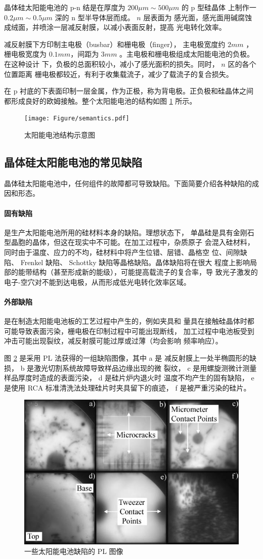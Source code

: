 晶体硅太阳能电池的 p-n 结是在厚度为 $200\mu m \sim 500\mu m$ 的 p 型硅晶体
上制作一 $0.2 \mu m \sim 0.5 \mu m$ 深的 n 型半导体层而成。 $n$ 层表面为
感光面，感光面用碱腐蚀成绒面，并喷涂一层减反射膜，以减小表面反射，提高
光电转化效率。

减反射膜下方印制主电极（busbar）和栅电极（finger），
主电极宽度约 $2mm$ ，栅电极宽度为
$0.1mm$，间距为 $3mm$ 。主电极和栅电极组成太阳能电池的负极。在这种设计
下，负极的总面积较小，减小了感光面积的损失。同时， $n$ 区的各个位置距离
栅电极都较近，有利于收集载流子，减少了载流子的复合损失。

在 p 衬底的下表面印制一层金属，作为正极，称为背电极。正负极和硅晶体之间
都形成良好的欧姆接触。整个太阳能电池的结构如图 \ref{fig:semantics} 所示。

\begin{figure}
\centering
\texttt{[image: Figure/semantics.pdf]}
\caption{太阳能电池结构示意图}
\label{fig:semantics}
\end{figure}

\subsection{晶体硅太阳能电池的常见缺陷}

晶体硅太阳能电池中，任何组件的故障都可导致缺陷。下面简要介绍各种缺陷的成
因和形态。

\paragraph{固有缺陷} 是生产太阳能电池所用的硅材料本身的缺陷。理想状态下，
单晶硅是具有金刚石型晶胞的晶体，但这在现实中不可能。在加工过程中，杂质原子
会混入硅材料，同时由于温度、应力的不均，硅材料中将产生位错、层错、晶格空
位、间隙缺陷、 Frenkel 缺陷、 Schottky 缺陷等晶格缺陷。晶体缺陷将在很大
程度上影响局部的能带结构（甚至形成新的能级），可能提高载流子的复合率，导
致光子激发的电子-空穴对不能到达电极，从而形成低光电转化效率区域。

\paragraph{外部缺陷} 是在制造太阳能电池板的工艺过程中产生的，例如夹具和
量具在接触硅晶体时都可能导致表面污染，栅电极在印制过程中可能出现断线，
加工过程中电池板受到冲击可能出现裂纹，减反射膜可能过厚或过薄（均会影响
频率响应）。

图 \ref{fig:PLimage} 是采用 PL 法获得的一组缺陷图像，其中 a 是 
减反射膜上一处半椭圆形的缺损， b 是激光切割系统故障导致样品边缘出现的微
裂纹， c 是用螺旋测微计测量样品厚度时造成的表面污染， d 是硅片炉内退火时
温度不均产生的固有缺陷， e 是使用 RCA 标准清洗法处理硅片时夹具留下的痕迹，
f 是被严重污染的硅片。\cite{FastPL}

\begin{figure}
\centering
\includegraphics[width=.6\textwidth]{Figure/PLimage.png}
\caption{一些太阳能电池缺陷的 PL 图像}
\label{fig:PLimage}
\end{figure}
